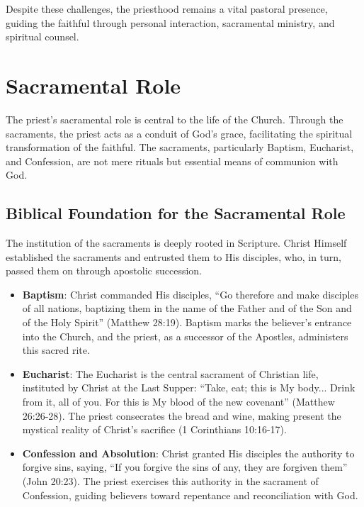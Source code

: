 \documentclass[12pt, doc]{apa7}   	%
\begin{document}
Despite these challenges, the priesthood remains a vital pastoral presence, guiding the faithful through personal interaction, sacramental ministry, and spiritual counsel.

\section{Sacramental Role}\label{sacramental}

The priest’s sacramental role is central to the life of the Church. Through the sacraments, the priest acts as a conduit of God’s grace, facilitating the spiritual transformation of the faithful. The sacraments, particularly Baptism, Eucharist, and Confession, are not mere rituals but essential means of communion with God.

\subsection{Biblical Foundation for the Sacramental Role}

The institution of the sacraments is deeply rooted in Scripture. Christ Himself established the sacraments and entrusted them to His disciples, who, in turn, passed them on through apostolic succession. 

\begin{itemize}
    \item \textbf{Baptism}: Christ commanded His disciples, ``Go therefore and make disciples of all nations, baptizing them in the name of the Father and of the Son and of the Holy Spirit'' (Matthew 28:19). Baptism marks the believer’s entrance into the Church, and the priest, as a successor of the Apostles, administers this sacred rite.
    
    \item \textbf{Eucharist}: The Eucharist is the central sacrament of Christian life, instituted by Christ at the Last Supper: ``Take, eat; this is My body... Drink from it, all of you. For this is My blood of the new covenant'' (Matthew 26:26-28). The priest consecrates the bread and wine, making present the mystical reality of Christ’s sacrifice (1 Corinthians 10:16-17).

    \item \textbf{Confession and Absolution}: Christ granted His disciples the authority to forgive sins, saying, ``If you forgive the sins of any, they are forgiven them'' (John 20:23). The priest exercises this authority in the sacrament of Confession, guiding believers toward repentance and reconciliation with God.
\end{itemize}
\end{document}
